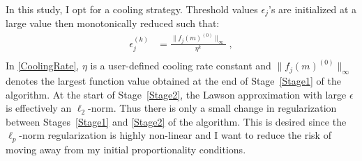 In this study, I opt for a cooling strategy. Threshold values $\epsilon_j$'s are initialized at a large value then monotonically reduced such that:
\begin{equation}\label{CoolingRate}
\begin{split}
\epsilon_j^{(k)} &=\frac{\|f_j({m})^{(0)}\|_\infty}{\eta^k}\;,\\
\end{split}
\end{equation}
In \eqref{CoolingRate}, $\eta$ is a user-defined cooling rate constant and $\|f_j({m})^{(0)}\|_\infty$ denotes the largest function value obtained at the end of Stage~\ref{Stage1} of the algorithm.
At the start of Stage~\ref{Stage2}, the Lawson approximation with large $\epsilon$ is effectively an $\ell_2$-norm. Thus there is only a small change in regularization between Stages~\ref{Stage1} and \ref{Stage2} of the algorithm.
This is desired since the $\ell_p$-norm regularization is highly non-linear and I want to reduce the risk of moving away from my initial proportionality conditions.

